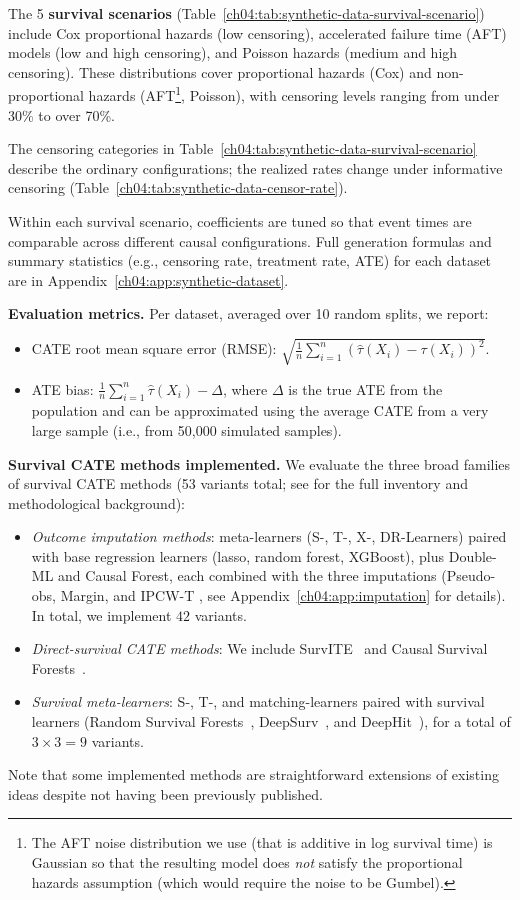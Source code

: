 

The 5 \textbf{survival scenarios} (Table~\ref{ch04:tab:synthetic-data-survival-scenario})
include Cox proportional hazards (low censoring), accelerated failure time (AFT) models (low and high censoring), and Poisson hazards (medium and high censoring).
These distributions cover proportional hazards (Cox) and non-proportional hazards (AFT\footnote{The AFT noise distribution we use (that is additive in log survival time) is Gaussian so that the resulting model does \emph{not} satisfy the proportional hazards assumption (which would require the noise to be Gumbel).}, Poisson), with censoring levels ranging from under 30\% to over 70\%.

The censoring categories in Table~\ref{ch04:tab:synthetic-data-survival-scenario} describe the ordinary configurations; the realized rates change under informative censoring (Table~\ref{ch04:tab:synthetic-data-censor-rate}).

Within each survival scenario, coefficients are tuned so that event times are comparable across different causal configurations.
Full generation formulas and summary statistics (e.g., censoring rate, treatment rate, ATE) for each dataset are in Appendix~\ref{ch04:app:synthetic-dataset}.

\textbf{Evaluation metrics.}
Per dataset, averaged over 10 random splits, we report:
\begin{itemize}
    \item CATE root mean square error (RMSE): $\sqrt{\frac1n\sum_{i=1}^n (\hat\tau(X_i)-\tau(X_i))^2}$.
    \item ATE bias: $\frac1n\sum_{i=1}^n\hat\tau(X_i)-\Delta$, where $\Delta$ is the true ATE from the population and can be approximated using the average CATE from a very large sample (i.e., from 50,000 simulated samples).
\end{itemize}

\textbf{Survival CATE methods implemented.}
We evaluate the three broad families of survival CATE methods (53 variants total; see \citep[Appendices C--D]{noroozizadeh2026survhte} for the full inventory and methodological background):
\begin{itemize}
    \item \emph{Outcome imputation methods}: meta-learners (S-, T-, X-, DR-Learners) paired with base regression learners (lasso, random forest, XGBoost), plus Double-ML and Causal Forest, each combined with the three imputations (Pseudo-obs, Margin, and IPCW-T \citep{qi2023an}, see Appendix~\ref{ch04:app:imputation} for details).
In total, we implement $42$ variants.
    \item \emph{Direct-survival CATE methods}:
    We include SurvITE~\citep{curth2021survite} and Causal Survival Forests~\citep{ch04:cui2023estimating}.
    \item \emph{Survival meta-learners}:
    S-, T-, and matching-learners paired with survival learners (Random Survival Forests~\citep{ch04:ishwaran2008random}, DeepSurv~\citep{ch04:katzman2018deepsurv}, and DeepHit~\citep{ch04:lee2018deephit}), for a total of \(3\times3=9\) variants.
\end{itemize}

Note that some implemented methods are straightforward extensions of existing ideas despite not having been previously published.
